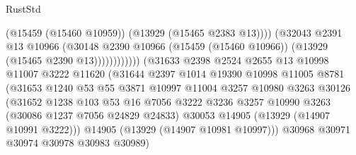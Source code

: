 \begin{lexlean}{RustStd}
\begin{coremodule}
                                              (@15459 (@15460 @10959))
                                              (@13929 (@15465 @2383 @13))))
                                          (@32043
                                            @2391
                                            @13
                                            @10966
                                            (@30148
                                              @2390
                                              @10966
                                              (@15459 (@15460 @10966))
                                              (@13929 (@15465 @2390 @13))))))))))))
                          (@31633
                            @2398
                            @2524
                            @2655
                            @13
                            @10998
                            @11007
                            @3222
                            @11620
                            (@31644
                              @2397
                              @1014
                              @19390
                              @10998
                              @11005
                              @8781
                              (@31653
                                @1240
                                @53
                                @55
                                @3871
                                @10997
                                @11004
                                @3257
                                @10980
                                @3263
                                @30126
                                (@31652
                                  @1238
                                  @103
                                  @53
                                  @16
                                  @7056
                                  @3222
                                  @3236
                                  @3257
                                  @10990
                                  @3263
                                  (@30086 @1237 @7056 @24829 @24833)
                                  @30053
                                  @14905
                                  (@13929 (@14907 @10991 @3222)))
                                @14905
                                (@13929 (@14907 @10981 @10997)))
                              @30968
                              @30971
                              @30974
                              @30978
                              @30983
                              @30989)

\end{coremodule}
\end{lexlean}
